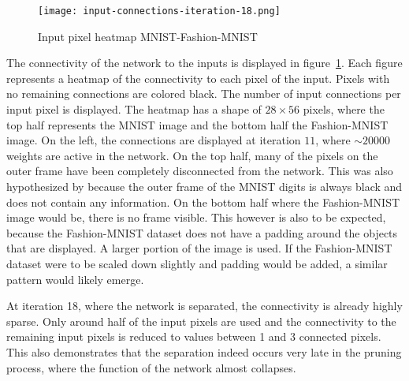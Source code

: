 \begin{figure}[ht]
    \centering
    \texttt{[image: input-connections-iteration-18.png]}
    \caption{
        Input pixel heatmap MNIST-Fashion-MNIST
    }\label{fig:input-heatmap}
\end{figure}

The connectivity of the network to the inputs is displayed in figure~\ref{fig:input-heatmap}.
Each figure represents a heatmap of the connectivity to each pixel of the input.
Pixels with no remaining connections are colored black.
The number of input connections per input pixel is displayed.
The heatmap has a shape of $28\times56$ pixels, where the top half represents the MNIST image and the bottom half the Fashion-MNIST image.
On the left, the connections are displayed at iteration $11$, where $\sim20000$ weights are active in the network.
On the top half, many of the pixels on the outer frame have been completely disconnected from the network.
This was also hypothesized by \textcite{LTH} because the outer frame of the MNIST digits is always black and does not contain any information.
On the bottom half where the Fashion-MNIST image would be, there is no frame visible.
This however is also to be expected, because the Fashion-MNIST dataset does not have a padding around the objects that are displayed. 
A larger portion of the image is used.
If the Fashion-MNIST dataset were to be scaled down slightly and padding would be added, a similar pattern would likely emerge.

At iteration 18, where the network is separated, the connectivity is already highly sparse.
Only around half of the input pixels are used and the connectivity to the remaining input pixels is reduced to values between 1 and 3 connected pixels.
This also demonstrates that the separation indeed occurs very late in the pruning process, where the function of the network almost collapses.
